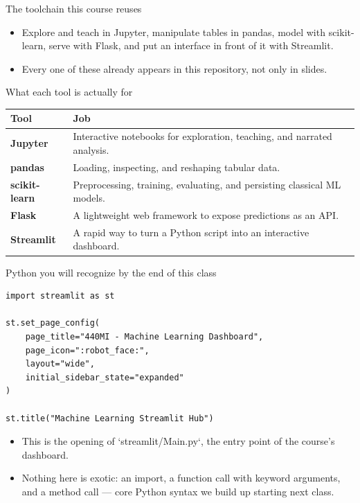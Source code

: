 \begin{frame}{The toolchain this course reuses}
\centering
{}
\vspace{0.6em}
\begin{itemize}
\item Explore and teach in Jupyter, manipulate tables in pandas, model with scikit-learn, serve with Flask, and put an interface in front of it with Streamlit.
\item Every one of these already appears in this repository, not only in slides.
\end{itemize}
\coursefooter
\end{frame}

\begin{frame}{What each tool is actually for}
\begin{tabularx}{\textwidth}{>{\bfseries}l X}
Tool & Job \\
\toprule
Jupyter & Interactive notebooks for exploration, teaching, and narrated analysis. \\
pandas & Loading, inspecting, and reshaping tabular data. \\
scikit-learn & Preprocessing, training, evaluating, and persisting classical ML models. \\
Flask & A lightweight web framework to expose predictions as an API. \\
Streamlit & A rapid way to turn a Python script into an interactive dashboard. \\
\bottomrule
\end{tabularx}
\coursefooter
\end{frame}

\begin{frame}[fragile]{Python you will recognize by the end of this class}
\begin{lstlisting}[style=coursepython]
import streamlit as st

st.set_page_config(
    page_title="440MI - Machine Learning Dashboard",
    page_icon=":robot_face:",
    layout="wide",
    initial_sidebar_state="expanded"
)

st.title("Machine Learning Streamlit Hub")
\end{lstlisting}
\begin{itemize}
\item This is the opening of `streamlit/Main.py`, the entry point of the course's dashboard.
\item Nothing here is exotic: an import, a function call with keyword arguments, and a method call --- core Python syntax we build up starting next class.
\end{itemize}
\coursefooter
\end{frame}

